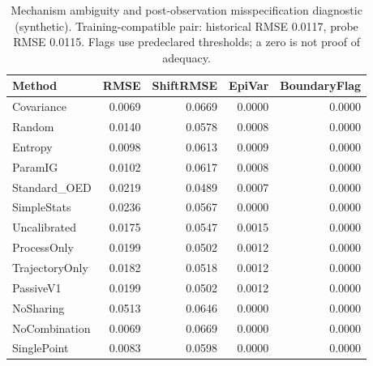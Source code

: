 \begin{table}[t]
\caption{Mechanism ambiguity and post-observation misspecification diagnostic (synthetic). Training-compatible pair: historical RMSE 0.0117, probe RMSE 0.0115. Flags use predeclared thresholds; a zero is not proof of adequacy.}
\label{tab:experiment1}
\begin{tabular}{lrrrr}
\toprule
Method & RMSE & ShiftRMSE & EpiVar & BoundaryFlag \\
\midrule
Covariance & 0.0069 & 0.0669 & 0.0000 & 0.0000 \\
Random & 0.0140 & 0.0578 & 0.0008 & 0.0000 \\
Entropy & 0.0098 & 0.0613 & 0.0009 & 0.0000 \\
ParamIG & 0.0102 & 0.0617 & 0.0008 & 0.0000 \\
Standard\_OED & 0.0219 & 0.0489 & 0.0007 & 0.0000 \\
SimpleStats & 0.0236 & 0.0567 & 0.0000 & 0.0000 \\
Uncalibrated & 0.0175 & 0.0547 & 0.0015 & 0.0000 \\
ProcessOnly & 0.0199 & 0.0502 & 0.0012 & 0.0000 \\
TrajectoryOnly & 0.0182 & 0.0518 & 0.0012 & 0.0000 \\
PassiveV1 & 0.0199 & 0.0502 & 0.0012 & 0.0000 \\
NoSharing & 0.0513 & 0.0646 & 0.0000 & 0.0000 \\
NoCombination & 0.0069 & 0.0669 & 0.0000 & 0.0000 \\
SinglePoint & 0.0083 & 0.0598 & 0.0000 & 0.0000 \\
\bottomrule
\end{tabular}
\end{table}
